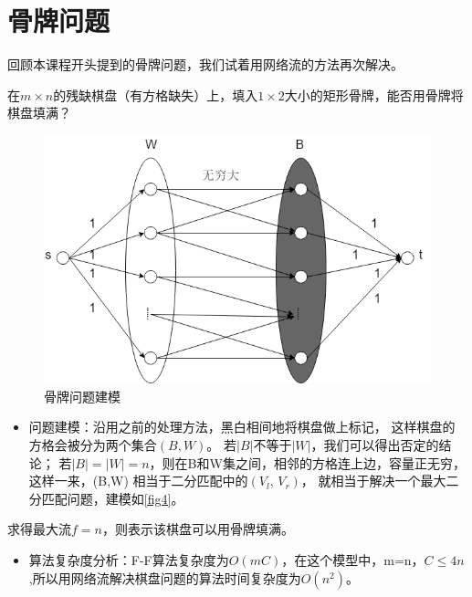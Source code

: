 \section{骨牌问题}
回顾本课程开头提到的骨牌问题，我们试着用网络流的方法再次解决。
\begin{example}
    在\(m \times n\)的残缺棋盘（有方格缺失）上，填入\(1 \times 2\)大小的矩形骨牌，能否用骨牌将棋盘填满？
\end{example}

\begin{figure}[htb]
  \centering
  \includegraphics[scale=0.6]{image/networkflow4.png}
  \caption{骨牌问题建模}\label{fig4}
\end{figure}

\begin{itemize}
    \item 问题建模：沿用之前的处理方法，黑白相间地将棋盘做上标记，
        这样棋盘的方格会被分为两个集合\((B,W)\)。
        若\(|B|\)不等于\(|W|\)，我们可以得出否定的结论；
        若\(|B|=|W|=n\)，则在B和W集之间，相邻的方格连上边，容量正无穷，
        这样一来，(B,W) 相当于二分匹配中的\((V_l,\,V_r)\)，
        就相当于解决一个最大二分匹配问题，建模如\autoref{fig4}。
\end{itemize}

求得最大流\(f=n\)，则表示该棋盘可以用骨牌填满。
\begin{itemize}
 \item 算法复杂度分析：F-F算法复杂度为\(O(mC)\)，在这个模型中，m=n，\(C \le 4n\),所以用网络流解决棋盘问题的算法时间复杂度为\(O(n^2)\)。
\end{itemize}

